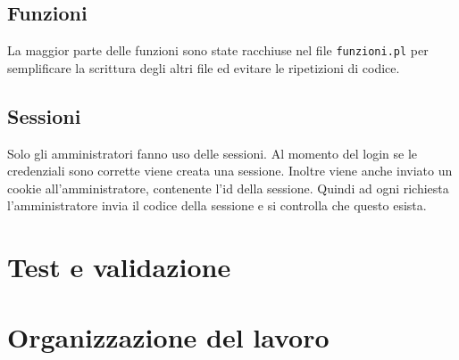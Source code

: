\documentclass{article}
\begin{document}
	\subsection{Funzioni}
		La maggior parte delle funzioni sono state racchiuse nel file \texttt{funzioni.pl} per semplificare la scrittura degli 
		altri file ed evitare le ripetizioni di codice.
	\subsection{Sessioni}
		Solo gli amministratori fanno uso delle sessioni. Al momento del login se le credenziali sono corrette viene creata una
		sessione. Inoltre viene anche inviato un cookie all'amministratore, contenente l'id della sessione. Quindi ad ogni
		richiesta l'amministratore invia il codice della sessione e si controlla che questo esista.

 \newpage

\section{Test e validazione}


 \newpage


\appendix
	\section{Organizzazione del lavoro}
	
\end{document}
